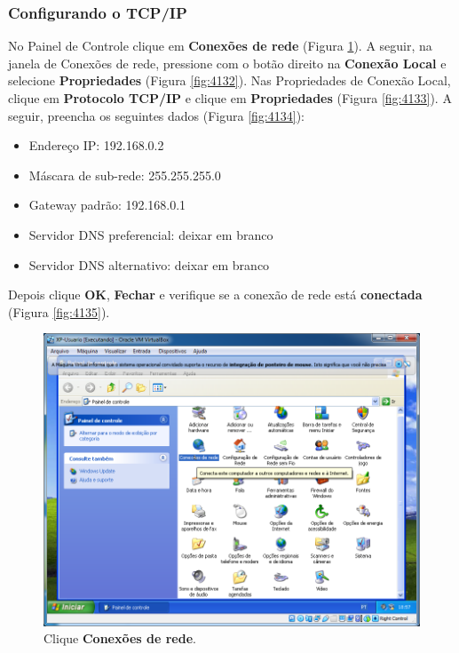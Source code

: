 \documentclass[10pt]{article}
\begin{document}
\subsubsection{Configurando o TCP/IP}
\par No Painel de Controle clique em \textbf{Conexões de rede} (Figura \ref{fig:4131}). A seguir, na janela de Conexões de rede, pressione com o botão direito na \textbf{Conexão Local} e selecione \textbf{Propriedades} (Figura \ref{fig:4132}). Nas Propriedades de Conexão Local, clique em \textbf{Protocolo TCP/IP} e clique em \textbf{Propriedades} (Figura \ref{fig:4133}). A seguir, preencha os seguintes dados (Figura \ref{fig:4134}): 
\begin{itemize}
    \item Endereço IP: 192.168.0.2
    \item Máscara de sub-rede: 255.255.255.0
    \item Gateway padrão: 192.168.0.1
    \item Servidor DNS preferencial: deixar em branco
    \item Servidor DNS alternativo: deixar em branco
\end{itemize}
\par Depois clique \textbf{OK}, \textbf{Fechar} e verifique se a conexão de rede está \textbf{conectada} (Figura \ref{fig:4135}).
\begin{figure}[H]
    \centering
    \caption{Clique \textbf{Conexões de rede}.}
    \label{fig:4131}
    \includegraphics[width=\linewidth]{images/xp_rede/013.png}
\end{figure}
\end{document}
